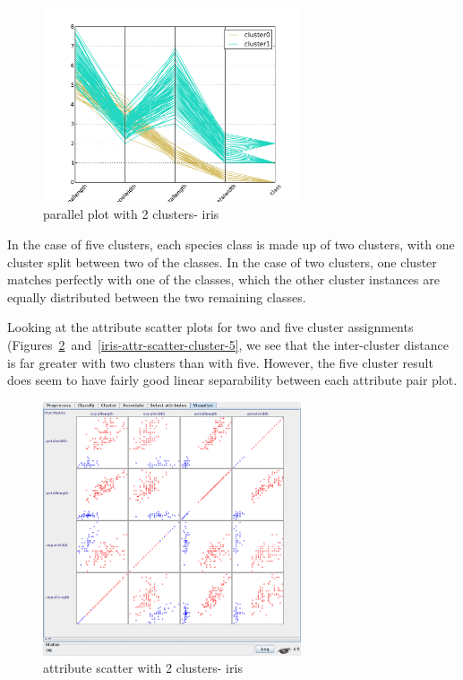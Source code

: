 \documentclass{sig-alternate}
\begin{document}
\begin{figure}[!htbp]
    \centering
    \includegraphics[width=3in]{part2/iris/parallel-cluster-2.pdf}
    \caption{parallel plot with 2 clusters- iris\label{iris-parallel-cluster-2}}
\end{figure} 

In the case of five clusters, each species class is made up of two clusters, with one cluster split between two of the classes. In the case of two clusters, one cluster matches perfectly with one of the classes, which the other cluster instances are equally distributed between the two remaining classes.

Looking at the attribute scatter plots for two and five cluster assignments (Figures~\ref{iris-attr-scatter-cluster-2}~and~\ref{iris-attr-scatter-cluster-5}, we see that the inter-cluster distance is far greater with two clusters than with five. However, the five cluster result does seem to have fairly good linear separability between each attribute pair plot.

\begin{figure}[!htbp]
    \centering
    \includegraphics[width=3in]{part2/iris/attribute-scatter-cluster-2.pdf}
    \caption{attribute scatter with 2 clusters- iris\label{iris-attr-scatter-cluster-2}}
\end{figure} 
\end{document}
